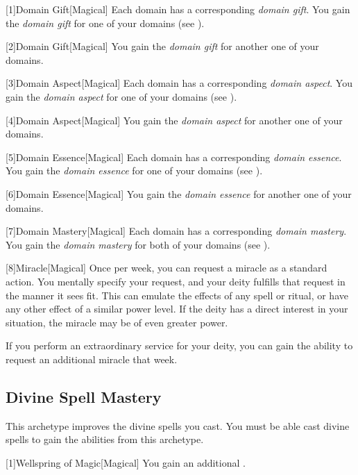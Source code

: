         [1]{Domain Gift}[Magical]
        Each domain has a corresponding \textit{domain gift}.
        You gain the \textit{domain gift} for one of your domains (see ).

        [2]{Domain Gift}[Magical]
        You gain the \textit{domain gift} for another one of your domains.

        [3]{Domain Aspect}[Magical]
        Each domain has a corresponding \textit{domain aspect}.
        You gain the \textit{domain aspect} for one of your domains (see ).

        [4]{Domain Aspect}[Magical]
        You gain the \textit{domain aspect} for another one of your domains.

        [5]{Domain Essence}[Magical]
        Each domain has a corresponding \textit{domain essence}.
        You gain the \textit{domain essence} for one of your domains (see ).

        [6]{Domain Essence}[Magical]
        You gain the \textit{domain essence} for another one of your domains.

        [7]{Domain Mastery}[Magical]
        Each domain has a corresponding \textit{domain mastery}.
        You gain the \textit{domain mastery} for both of your domains (see ).

        [8]{Miracle}[Magical]
        Once per week, you can request a miracle as a standard action.
        You mentally specify your request, and your deity fulfills that request in the manner it sees fit.
        This can emulate the effects of any spell or ritual, or have any other effect of a similar power level.
        If the deity has a direct interest in your situation, the miracle may be of even greater power.

        If you perform an extraordinary service for your deity, you can gain the ability to request an additional miracle that week.

    \subsection{Divine Spell Mastery}
        This archetype improves the divine spells you cast.
        You must be able cast divine spells to gain the abilities from this archetype.

        [1]{Wellspring of Magic}[Magical]
        You gain an additional .

